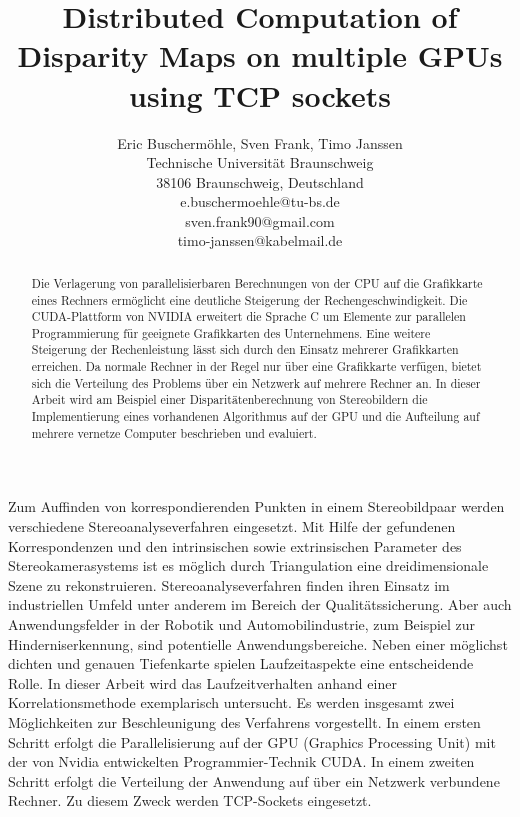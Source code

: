 \documentclass[times, 10pt,twocolumn]{article}
\begin{document}
\title{Distributed Computation of Disparity Maps on multiple GPUs using TCP sockets}

\author{Eric Buschermöhle, Sven Frank, Timo Janssen\\
Technische Universität Braunschweig \\  38106 Braunschweig, Deutschland\\
e.buschermoehle@tu-bs.de\\
sven.frank90@gmail.com\\
timo-janssen@kabelmail.de\\
}


\maketitle
\thispagestyle{empty}

\begin{abstract}
Die Verlagerung von parallelisierbaren Berechnungen von der CPU auf die Grafikkarte eines Rechners ermöglicht eine deutliche Steigerung der Rechengeschwindigkeit. Die CUDA-Plattform von NVIDIA erweitert die Sprache C um Elemente zur parallelen Programmierung für geeignete Grafikkarten des Unternehmens. Eine weitere Steigerung der Rechenleistung lässt sich durch den Einsatz mehrerer Grafikkarten erreichen. Da normale Rechner in der Regel nur über eine Grafikkarte verfügen, bietet sich die Verteilung des Problems über ein Netzwerk auf mehrere Rechner an. In dieser Arbeit wird am Beispiel einer Disparitätenberechnung von Stereobildern die Implementierung eines vorhandenen Algorithmus auf der GPU und die Aufteilung auf mehrere vernetze Computer beschrieben und evaluiert.
 
\end{abstract}




Zum Auffinden von korrespondierenden Punkten in einem Stereobildpaar werden verschiedene Stereoanalyseverfahren eingesetzt. Mit Hilfe der gefundenen Korrespondenzen und den intrinsischen sowie extrinsischen Parameter des Stereokamerasystems ist es möglich durch Triangulation eine dreidimensionale Szene zu rekonstruieren. Stereoanalyseverfahren finden ihren Einsatz im industriellen Umfeld unter anderem im Bereich der Qualitätssicherung. Aber auch Anwendungsfelder in der Robotik und Automobilindustrie, zum Beispiel zur Hinderniserkennung, sind potentielle Anwendungsbereiche. Neben einer möglichst dichten und genauen Tiefenkarte spielen Laufzeitaspekte eine entscheidende Rolle. In dieser Arbeit wird das Laufzeitverhalten anhand einer Korrelationsmethode exemplarisch untersucht. Es werden insgesamt zwei Möglichkeiten zur Beschleunigung des Verfahrens vorgestellt. In einem ersten Schritt erfolgt die Parallelisierung auf der GPU (Graphics Processing Unit) mit der von Nvidia entwickelten Programmier-Technik CUDA. In einem zweiten Schritt erfolgt die Verteilung der Anwendung auf über ein Netzwerk verbundene Rechner. Zu diesem Zweck werden TCP-Sockets eingesetzt.
\end{document}

